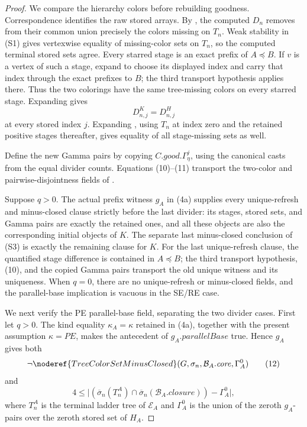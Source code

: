 \begin{proof}
We compare the hierarchy colors before rebuilding goodness.
Correspondence identifies the raw stored arrays.  By
, the computed \(D_n\) removes from their
common union precisely the colors missing on \(T_n\).  Weak stability in
(S1) gives vertexwise equality of missing-color sets on \(T_n\), so the
computed terminal stored sets agree.  Every starred stage is an exact
prefix of \(A\preccurlyeq B\).  If \(v\) is a vertex of such a stage,
expand  to choose its displayed index and
carry that index through the exact prefixes to \(B\); the third transport
hypothesis applies there.  Thus the two colorings have the same
tree-missing colors on every starred stage.  Expanding
 gives
\[
                         D^K_{n,j}=D^H_{n,j}                  \tag{10}
\]
at every stored index \(j\).  Expanding
, using \(T_n\) at index zero and
the retained positive stages thereafter, gives equality of all
stage-missing sets as well.                                      \(\tag{11}\)

Define the new Gamma pairs by copying
\(C.\mathit{good}.\Gamma^j_\eta\), using the canonical casts from the
equal divider counts.  Equations (10)--(11) transport the two-color and
pairwise-disjointness fields of .

Suppose \(q>0\).  The actual prefix witness \(g_A\) in (4a) supplies every
unique-refresh and minus-closed clause strictly before the last divider:
its stages, stored sets, and Gamma pairs are exactly the retained ones,
and all these objects are also the corresponding initial objects of
\(K\).  The separate last minus-closed conclusion of (S3) is exactly the
remaining clause for \(K\).  For the last unique-refresh clause, the
quantified stage difference is contained in \(A\preccurlyeq B\); the
third transport hypothesis, (10), and the copied Gamma pairs transport
the old unique witness and its uniqueness.  When \(q=0\), there are no
unique-refresh or minus-closed fields, and the parallel-base implication
is vacuous in the SE/RE case.

We next verify the PE parallel-base field, separating the two divider
cases.  First let \(q>0\).  The kind equality
\(\kappa_A=\kappa\) retained in (4a), together with the present assumption
\(\kappa=PE\), makes the antecedent of \(g_A.\mathit{parallelBase}\)
true.  Hence \(g_A\) gives both
\[
 \neg\noderef{TreeColorSetMinusClosed}
   (G,\sigma_n,\mathcal B_A.\mathit{core},\Gamma_A^0)           \tag{12}
\]
and
\[
 4\leq\bigl|(\overline{\sigma}_n(T_n^A)\cap
       \overline{\sigma}_n(\mathcal B_A.\mathit{closure}))
       -\Gamma_A^0\bigr|,                                      \tag{13}
\]
where \(T_n^A\) is the terminal ladder tree of \(\mathcal E_A\) and
\(\Gamma_A^0\) is the union of the zeroth \(g_A\)-pairs over the zeroth
stored set of \(H_A\).


\end{proof}
